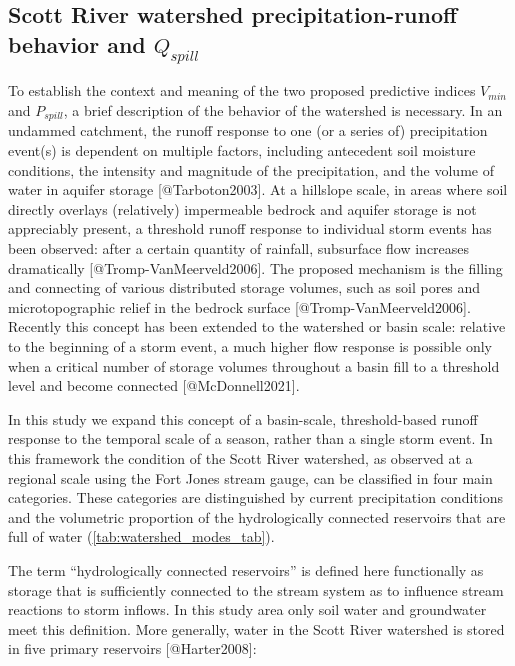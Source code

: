 \documentclass[
]{article}
\begin{document}
\hypertarget{scott-river-watershed-precipitation-runoff-behavior-and-q_spill}{%
\subsection{\texorpdfstring{Scott River watershed precipitation-runoff
behavior and
\(Q_{spill}\)}{Scott River watershed precipitation-runoff behavior and Q\_\{spill\}}}\label{scott-river-watershed-precipitation-runoff-behavior-and-q_spill}}

To establish the context and meaning of the two proposed predictive
indices \(V_{min}\) and \(P_{spill}\), a brief description of the
behavior of the watershed is necessary. In an undammed catchment, the
runoff response to one (or a series of) precipitation event(s) is
dependent on multiple factors, including antecedent soil moisture
conditions, the intensity and magnitude of the precipitation, and the
volume of water in aquifer storage {[}@Tarboton2003{]}. At a hillslope
scale, in areas where soil directly overlays (relatively) impermeable
bedrock and aquifer storage is not appreciably present, a threshold
runoff response to individual storm events has been observed: after a
certain quantity of rainfall, subsurface flow increases dramatically
{[}@Tromp-VanMeerveld2006{]}. The proposed mechanism is the filling and
connecting of various distributed storage volumes, such as soil pores
and microtopographic relief in the bedrock surface
{[}@Tromp-VanMeerveld2006{]}. Recently this concept has been extended to
the watershed or basin scale: relative to the beginning of a storm
event, a much higher flow response is possible only when a critical
number of storage volumes throughout a basin fill to a threshold level
and become connected {[}@McDonnell2021{]}.

In this study we expand this concept of a basin-scale, threshold-based
runoff response to the temporal scale of a season, rather than a single
storm event. In this framework the condition of the Scott River
watershed, as observed at a regional scale using the Fort Jones stream
gauge, can be classified in four main categories. These categories are
distinguished by current precipitation conditions and the volumetric
proportion of the hydrologically connected reservoirs that are full of
water (\autoref{tab:watershed_modes_tab}).

The term ``hydrologically connected reservoirs'' is defined here
functionally as storage that is sufficiently connected to the stream
system as to influence stream reactions to storm inflows. In this study
area only soil water and groundwater meet this definition. More
generally, water in the Scott River watershed is stored in five primary
reservoirs {[}@Harter2008{]}:
\end{document}

